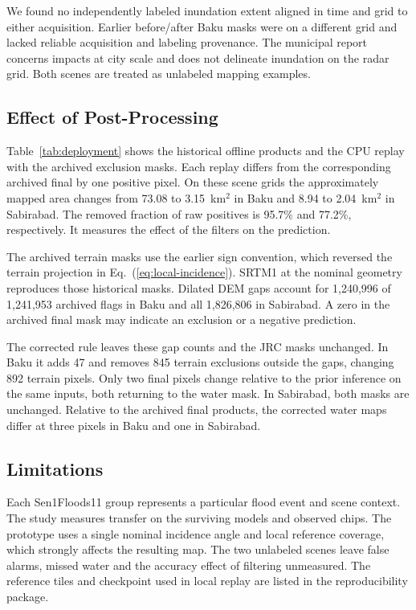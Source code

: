 We found no independently labeled inundation extent aligned in time
and grid to either acquisition. Earlier before/after Baku masks were
on a different grid and lacked reliable acquisition and labeling
provenance. The municipal report concerns impacts at city scale and
does not delineate inundation on the radar grid. Both scenes are
treated as unlabeled mapping examples.

\subsection{Effect of Post-Processing}
\label{sec:map-effects}

Table~\ref{tab:deployment} shows the historical offline products and
the CPU replay with the archived exclusion masks. Each replay differs
from the corresponding archived final by one positive pixel. On these
scene grids the approximately mapped area changes from 73.08 to
3.15~km$^2$ in Baku and 8.94 to 2.04~km$^2$ in Sabirabad. The removed
fraction of raw positives is 95.7\% and 77.2\%, respectively. It measures
the effect of the filters on the prediction.

\begin{table}[!htbp]
\caption{Historical offline map products and replay using the archived
terrain rule. All values are positive pixel counts. The corrected replay
is reported separately in Table~\ref{tab:api-replay}.}
\label{tab:deployment}
\centering\small

\end{table}

The archived terrain masks use the earlier sign convention, which
reversed the terrain projection in Eq.~(\ref{eq:local-incidence}).
SRTM1 at the nominal geometry reproduces those historical masks.
Dilated DEM gaps account for 1,240,996 of 1,241,953 archived flags in
Baku and all 1,826,806 in Sabirabad. A zero in the archived final
mask may indicate an exclusion or a negative prediction.

The corrected rule leaves these gap counts and the JRC masks
unchanged. In Baku it adds 47 and removes 845 terrain exclusions
outside the gaps, changing 892 terrain pixels. Only two final pixels
change relative to the prior inference on the same inputs, both
returning to the water mask. In Sabirabad, both masks are unchanged.
Relative to the archived final products, the corrected water maps
differ at three pixels in Baku and one in Sabirabad.


\subsection{Limitations}

Each Sen1Floods11 group represents a particular flood event and scene
context. The study measures transfer on the surviving models and
observed chips. The prototype uses a single nominal incidence angle
and local reference coverage, which strongly affects the resulting
map. The two unlabeled scenes leave false alarms, missed water and
the accuracy effect of filtering unmeasured. The reference tiles and
checkpoint used in local replay are listed in the reproducibility
package.
